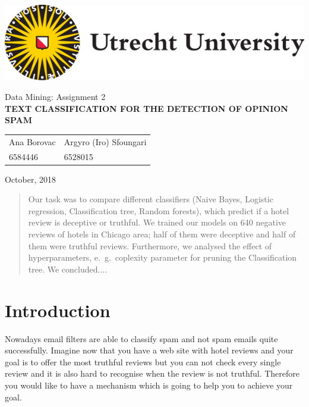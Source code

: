 \documentclass[a4paper,11pt]{article}
\begin{document}
\thispagestyle{empty}

\includegraphics[scale=0.35]{UUlogo.png}

\vspace{50mm}

\begin{center}
\begin{large}
Data Mining: Assignment 2 \\[3mm]
\textbf{
\uppercase{Text Classification for the Detection of Opinion Spam}} \\[25mm]
\end{large}

\begin{tabularx}{\textwidth}{YY}
Ana Borovac & Argyro (Iro) Sfoungari \\
6584446 & 6528015
\end{tabularx}
\end{center}

\vfill

October, 2018

\newpage

\tableofcontents

\vspace{2.5cm}

\begin{abstract}
Our task was to compare different classifiers (Naive Bayes, Logistic regression, Classification tree, Random forests), which predict if a hotel review is deceptive or truthful. We trained our models on 640 negative reviews of hotels in Chicago area; half of them were deceptive and half of them were truthful reviews. Furthermore, we analysed the effect of hyperparameters, e.~g.\ coplexity parameter for pruning the Classification tree. We concluded....
\end{abstract}

\newpage

\section{Introduction}
Nowadays email filters are able to classify spam and not spam emails quite successfully. Imagine now that you have a web site with hotel reviews and your goal is to offer the most truthful reviews but you can not check every single review and it is also hard to recognise when the review is not truthful. Therefore you would like to have a mechanism which is going to help you to achieve your goal. 
\end{document}
